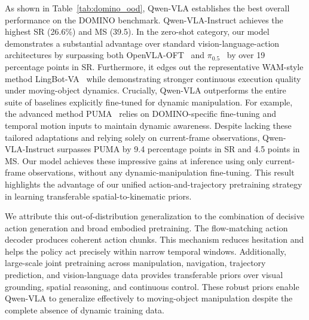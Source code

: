 \documentclass{article}
\begin{document}
As shown in Table~\ref{tab:domino_ood}, Qwen-VLA establishes the best overall performance on the DOMINO benchmark. Qwen-VLA-Instruct achieves the highest SR (26.6\%) and MS (39.5). In the zero-shot category, our model demonstrates a substantial advantage over standard vision-language-action architectures by surpassing both OpenVLA-OFT~\citep{kim2025fine} and $\pi_{0.5}$~\citep{black2025pi05} by over 19 percentage points in SR. Furthermore, it edges out the representative WAM-style method LingBot-VA~\citep{li2026causal} while demonstrating stronger continuous execution quality under moving-object dynamics. Crucially, Qwen-VLA outperforms the entire suite of baselines explicitly fine-tuned for dynamic manipulation. For example, the advanced method PUMA~\citep{fang2026towards} relies on DOMINO-specific fine-tuning and temporal motion inputs to maintain dynamic awareness. Despite lacking these tailored adaptations and relying solely on current-frame observations, Qwen-VLA-Instruct surpasses PUMA by 9.4 percentage points in SR and 4.5 points in MS. Our model achieves these impressive gains at inference using only current-frame observations, without any dynamic-manipulation fine-tuning. This result highlights the advantage of our unified action-and-trajectory pretraining strategy in learning transferable spatial-to-kinematic priors.


We attribute this out-of-distribution generalization to the combination of decisive action generation and broad embodied pretraining. The flow-matching action decoder produces coherent action chunks. This mechanism reduces hesitation and helps the policy act precisely within narrow temporal windows. Additionally, large-scale joint pretraining across manipulation, navigation, trajectory prediction, and vision-language data provides transferable priors over visual grounding, spatial reasoning, and continuous control. These robust priors enable Qwen-VLA to generalize effectively to moving-object manipulation despite the complete absence of dynamic training data.
\end{document}
